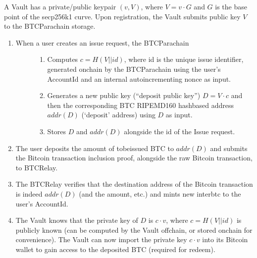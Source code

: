 \documentclass[a4paper,10pt,english]{sphinxmanual}
\begin{document}

A Vault has a private/public keypair \((v, V)\), where \(V = v·G\) and \(G\) is the base point of the secp256k1 curve.
Upon registration, the Vault submits public key \(V\) to the BTC\sphinxhyphen{}Parachain storage.

\begin{enumerate}
%
\item {} \begin{description}
\item[{When a user creates an issue request, the BTC\sphinxhyphen{}Parachain}] \leavevmode\begin{enumerate}
%
\item {} 
Computes \(c = H(V || id)\), where id is the unique issue identifier, generated on\sphinxhyphen{}chain by the BTC\sphinxhyphen{}Parachain using the user’s AccountId and an internal auto\sphinxhyphen{}incrementing nonce as input.

\item {} 
Generates a new public key (“deposit public key”) \(D = V·c\) and then the corresponding BTC RIPEMD\sphinxhyphen{}160 hash\sphinxhyphen{}based address \(addr(D)\) (‘deposit’ address) using \(D\) as input.

\item {} 
Stores \(D\) and \(addr(D)\) alongside the id of the Issue request.

\end{enumerate}

\end{description}

\item {} 
The user deposits the amount of to\sphinxhyphen{}be\sphinxhyphen{}issued BTC to \(addr(D)\) and submits the Bitcoin transaction inclusion proof, alongside the raw Bitcoin transaction, to BTC\sphinxhyphen{}Relay.

\item {} 
The BTC\sphinxhyphen{}Relay verifies that the destination address of the Bitcoin transaction is indeed \(addr(D)\) (and the amount, etc.) and mints new interbtc to the user’s AccountId.

\item {} 
The Vault knows that the private key of \(D\) is \(c·v\), where \(c = H(V || id)\) is publicly known (can be computed by the Vault off\sphinxhyphen{}chain, or stored on\sphinxhyphen{}chain for convenience). The Vault can now import the private key \(c·v\) into its Bitcoin wallet to gain access to the deposited BTC (required for redeem).

\end{enumerate}
\end{document}
